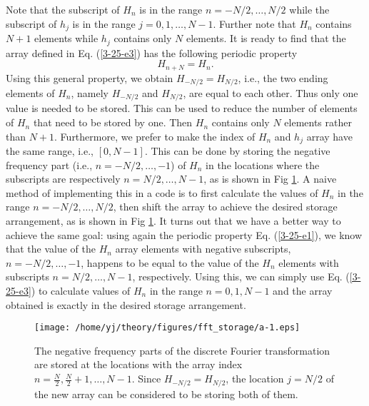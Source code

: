 \documentclass{article}
\begin{document}
Note that the subscript of $H_n$ is in the range $n = - N / 2, \ldots, N / 2$
while the subscript of $h_j$ is in the range $j = 0, 1, \ldots, N - 1$.
Further note that $H_n$ contains $N + 1$ elements while $h_j$ contains only
$N$ elements. It is ready to find that the array defined in Eq.
(\ref{3-25-e3}) has the following periodic property
\begin{equation}
  \label{3-25-e1} H_{n + N} = H_n .
\end{equation}
Using this general property, we obtain $H_{- N / 2} = H_{N / 2}$, i.e., the
two ending elements of $H_n$, namely $H_{- N / 2}$ and $H_{N / 2}$, are equal
to each other. Thus only one value is needed to be stored. This can be used to
reduce the number of elements of $H_n$ that need to be stored by one. Then
$H_n$ contains only $N$ elements rather than $N + 1$. Furthermore, we prefer
to make the index of $H_n$ and $h_j$ array have the same range, i.e., $[0, N -
1]$. This can be done by storing the negative frequency part (i.e., $n = - N /
2, \ldots, - 1$) of $H_n$ in the locations where the subscripts are
respectively $n = N / 2, \ldots, N - 1$, as is shown in Fig \ref{4-16-1}. A
naive method of implementing this in a code is to first calculate the values
of $H_n$ in the range $n = - N / 2, \ldots, N / 2$, then shift the array to
achieve the desired storage arrangement, as is shown in Fig \ref{4-16-1}. It
turns out that we have a better way to achieve the same goal: using again the
periodic property Eq. (\ref{3-25-e1}), we know that the value of the $H_n$
array elements with negative subscripts, $n = - N / 2, \ldots, - 1$, happens
to be equal to the value of the $H_n$ elements with subscripts $n = N / 2,
\ldots, N - 1$, respectively. Using this, we can simply use Eq.
(\ref{3-25-e3}) to calculate values of $H_n$ in the range $n = 0, 1, N - 1$
and the array obtained is exactly in the desired storage arrangement.

\begin{figure}[h]
  \texttt{[image: /home/yj/theory/figures/fft\_storage/a-1.eps]}
  \caption{\label{4-16-1}The negative frequency parts of the discrete Fourier
  transformation are stored at the locations with the array index $n =
  \frac{N}{2}, \frac{N}{2} + 1, \ldots, N - 1$. Since $H_{- N / 2} = H_{N /
  2}$, the location $j = N / 2$ of the new array can be considered to be
  storing both of them.}
\end{figure}
\end{document}
